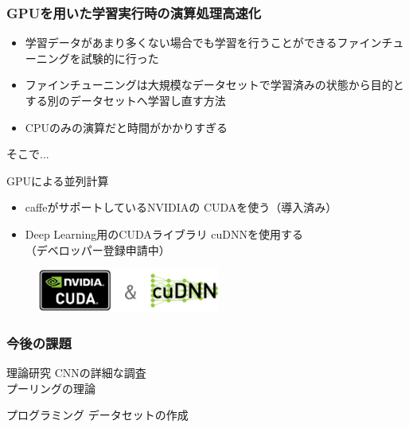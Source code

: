 \documentclass[dvipdfmx,11pt,notheorems]{beamer}
\theoremstyle{definition}
\begin{document}
\begin{frame}\frametitle{GPUを用いた学習実行時の演算処理高速化}
\begin{itemize}
\item 学習データがあまり多くない場合でも学習を行うことができるファインチューニングを試験的に行った
\item ファインチューニングは大規模なデータセットで学習済みの状態から目的とする別のデータセットへ学習し直す方法
\item CPUのみの演算だと時間がかかりすぎる
\end{itemize}

そこで...
\begin{block}{GPUによる並列計算}
\begin{itemize}
\item caffeがサポートしているNVIDIAの{\color{orange} CUDA}を使う（導入済み）
\item Deep Learning用のCUDAライブラリ{\color{orange} cuDNN}を使用する\\（デベロッパー登録申請中）
\end{itemize}
\end{block}

\begin{figure}[tb]
  \begin{center}
    \includegraphics[clip,width=6cm]{./fig/eps/GPU.eps}
  \end{center}
\end{figure}

\end{frame}

\begin{frame}\frametitle{今後の課題}

\begin{block}{理論研究}
CNNの詳細な調査\\
プーリングの理論
\end{block}

\vspace{1cm}
\begin{exampleblock}{プログラミング}
データセットの作成
\end{exampleblock}
\end{frame}
\end{document}
